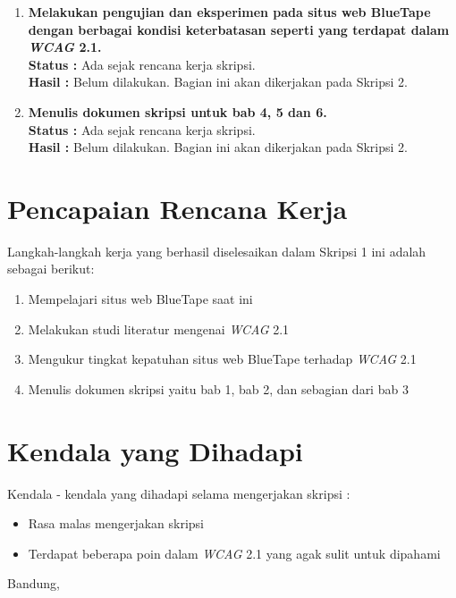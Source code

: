 \documentclass[a4paper,twoside]{article}
\begin{document}
\begin{enumerate}
		\item \textbf{Melakukan pengujian dan eksperimen pada situs web BlueTape dengan berbagai kondisi keterbatasan seperti yang terdapat dalam \textit{WCAG} 2.1.}\\
		{\bf Status :} Ada sejak rencana kerja skripsi.\\
		{\bf Hasil :} Belum dilakukan. Bagian ini akan dikerjakan pada Skripsi 2.

		\item \textbf{Menulis dokumen skripsi untuk bab 4, 5 dan 6.}\\
		{\bf Status :} Ada sejak rencana kerja skripsi.\\
		{\bf Hasil :} Belum dilakukan. Bagian ini akan dikerjakan pada Skripsi 2.

	\end{enumerate}

\section{Pencapaian Rencana Kerja}
Langkah-langkah kerja yang berhasil diselesaikan dalam Skripsi 1 ini adalah sebagai berikut:
\begin{enumerate}
	\item Mempelajari situs web BlueTape saat ini
	\item Melakukan studi literatur mengenai \textit{WCAG} 2.1
	\item Mengukur tingkat kepatuhan situs web BlueTape terhadap \textit{WCAG} 2.1
	\item Menulis dokumen skripsi yaitu bab 1, bab 2, dan sebagian dari bab 3
\end{enumerate}



\section{Kendala yang Dihadapi}
Kendala - kendala yang dihadapi selama mengerjakan skripsi :
\begin{itemize}
	\item Rasa malas mengerjakan skripsi
	\item Terdapat beberapa poin dalam \textit{WCAG} 2.1 yang agak sulit untuk dipahami
	
\end{itemize}

\vspace{1cm}
\centering Bandung, \tanggal\\
\vspace{2cm} \nama \\ 
\vspace{1cm}
\end{document}
